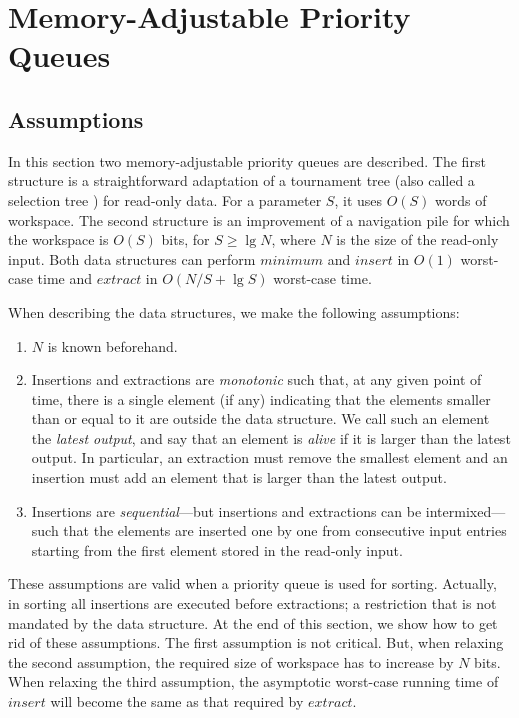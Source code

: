 \documentclass[final,onetabnum,onefignum,onethmnum]{siamltex}
\newcommand{\Minimum}{\mbox{$\mathit{minimum}$}}
\newcommand{\Insert}{\mbox{$\mathit{insert}$}}
\newcommand{\Extract}{\mbox{$\mathit{extract}$}}
\begin{document}
\section{Memory-Adjustable Priority Queues}
\label{sec:priority-queues}

\subsection{Assumptions}
In this section two memory-adjustable priority queues are described.
The first structure is a straightforward adaptation of a tournament tree
(also called a selection tree \cite[Section 5.4.1]{Knu73}) for
read-only data. For a parameter $S$, it uses $O(S)$ words of workspace. 
The second structure is an improvement of a navigation pile \cite{KV03} for which 
the workspace is $O(S)$ bits, for $S \geq \lg N$, where $N$ is the size of the 
read-only input. Both data structures can perform \Minimum{} and \Insert{} 
in $O(1)$ worst-case time and \Extract{} in $O(N/S + \lg S)$ worst-case time.

When describing the data structures, we
make the following assumptions:
\begin{enumerate}
\item $N$ is known beforehand.
\item Insertions and extractions are \emph{monotonic} such that,
  at any given point of time, there is a single element (if any)
  indicating that the elements smaller than or equal to it are outside
  the data structure.  We call such an element the \emph{latest
    output}, and say that an element is \emph{alive} if it is larger
  than the latest output. In particular, an extraction must remove the
  smallest element and an insertion must add an element that is larger
  than the latest output.
\item Insertions are \emph{sequential}---but insertions and
  extractions can be intermixed---such that the elements are inserted
  one by one from consecutive input entries starting from the first
  element stored in the read-only input.
\end{enumerate}
These assumptions are valid when a priority queue is used
for sorting. Actually, in sorting all insertions are executed before
extractions; a restriction that is not mandated by the data structure.
At the end of this section, we show how to get rid of these
assumptions. The first assumption is not critical. But, 
when relaxing the second assumption, the required size of workspace has to increase by $N$ bits.
When relaxing the third assumption, the asymptotic worst-case running time of \Insert{}
will become the same as that required by \Extract{}.
\end{document}

